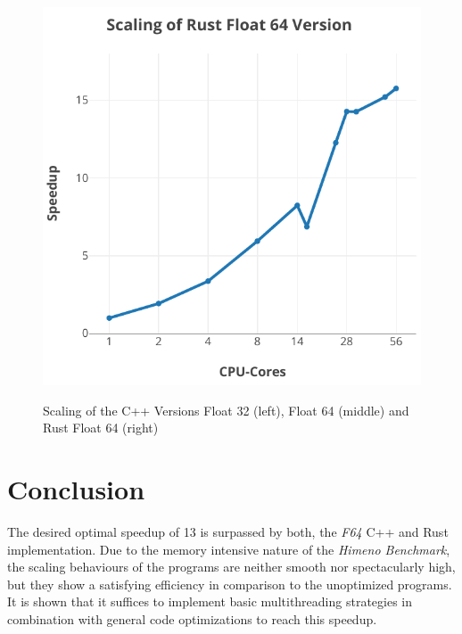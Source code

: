 \begin{figure}[bt]
{        \includegraphics[width=0.32\paperwidth]{himeno/assets/himeno-rust_2-scaling.pdf}
    }
    \caption{Scaling of the C++ Versions Float 32 (left), Float 64 (middle) and Rust Float 64 (right)}
    \label{fig:scaling}
\end{figure}



\section{Conclusion}
\label{sec:conclusion}

The desired optimal speedup of 13 is surpassed by both, the \textit{F64} C++ and Rust implementation. Due to the memory intensive nature of the \textit{Himeno Benchmark}, the scaling behaviours of the programs are neither smooth nor spectacularly high, but they show a satisfying efficiency in comparison to the unoptimized programs. It is shown that it suffices to implement basic multithreading strategies in combination with general code optimizations to reach this speedup.


\clearpage
\thispagestyle{empty}

